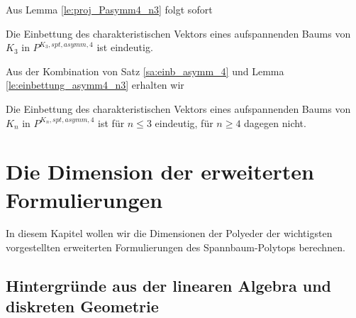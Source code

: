 \documentclass[10p,a4paper,BCOR = 12mm, DIV=15]{scrbook}
\begin{document}
Aus Lemma \ref{le:proj_Pasymm4_n3} folgt sofort

\begin{Le}
\label{le:einbettung_asymm4_n3}
Die Einbettung des charakteristischen Vektors eines aufspannenden Baums von $K_3$ in $P^{K_3, spt, asymm, 4}$ ist eindeutig.
\end{Le}

Aus der Kombination von Satz \ref{sa:einb_asymm_4} und Lemma \ref{le:einbettung_asymm4_n3} erhalten wir

\begin{Kor}
Die Einbettung des charakteristischen Vektors eines aufspannenden Baums von $K_n$ in $P^{K_n, spt, asymm, 4}$ ist für $n \leq 3$ eindeutig, für $n\geq 4$ dagegen nicht.
\end{Kor}

\chapter{Die Dimension der erweiterten Formulierungen}

In diesem Kapitel wollen wir die Dimensionen der Polyeder der wichtigsten vorgestellten erweiterten Formulierungen des Spannbaum-Polytops berechnen.

\section{Hintergründe aus der linearen Algebra und diskreten Geometrie}
\end{document}
